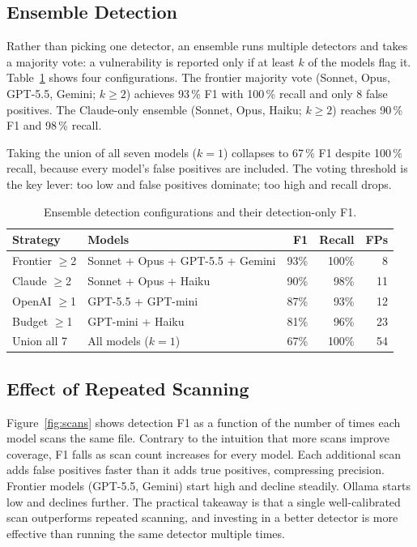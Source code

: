 \documentclass[12pt]{article}
\begin{document}
\subsection{Ensemble Detection}

Rather than picking one detector, an ensemble runs multiple detectors and
takes a majority vote: a vulnerability is reported only if at least $k$ of the
models flag it. Table~\ref{tab:ensemble} shows four configurations. The
frontier majority vote (Sonnet, Opus, GPT-5.5, Gemini; $k \geq 2$) achieves
93\,\% F1 with 100\,\% recall and only 8 false positives. The Claude-only
ensemble (Sonnet, Opus, Haiku; $k \geq 2$) reaches 90\,\% F1 and 98\,\%
recall.

Taking the union of all seven models ($k = 1$) collapses to 67\,\% F1 despite
100\,\% recall, because every model's false positives are included. The voting
threshold is the key lever: too low and false positives dominate; too high and
recall drops.

\begin{table}[H]
  \centering
  \caption{Ensemble detection configurations and their detection-only F1.}
  \label{tab:ensemble}
  \begin{tabular}{llrrr}
    \toprule
    Strategy & Models & F1 & Recall & FPs \\
    \midrule
    Frontier $\geq$2 & Sonnet + Opus + GPT-5.5 + Gemini & 93\% & 100\% & 8  \\
    Claude $\geq$2   & Sonnet + Opus + Haiku            & 90\% & 98\%  & 11 \\
    OpenAI $\geq$1   & GPT-5.5 + GPT-mini               & 87\% & 93\%  & 12 \\
    Budget $\geq$1   & GPT-mini + Haiku                 & 81\% & 96\%  & 23 \\
    Union all 7      & All models ($k=1$)               & 67\% & 100\% & 54 \\
    \bottomrule
  \end{tabular}
\end{table}

\subsection{Effect of Repeated Scanning}

Figure~\ref{fig:scans} shows detection F1 as a function of the number of
times each model scans the same file. Contrary to the intuition that more
scans improve coverage, F1 falls as scan count increases for every model.
Each additional scan adds false positives faster than it adds true positives,
compressing precision. Frontier models (GPT-5.5, Gemini) start high and
decline steadily. Ollama starts low and declines further. The practical
takeaway is that a single well-calibrated scan outperforms repeated scanning,
and investing in a better detector is more effective than running the same
detector multiple times.
\end{document}
